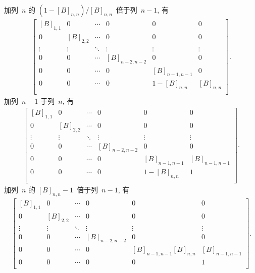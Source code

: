 加列~\(n\) 的 \((1 - [B]_{n,n})/[B]_{n,n}\)~倍于列~\(n-1\), 有
\begin{align*}
    \begin{bmatrix}
        [B]_{1,1} & 0         & \cdots & 0             & 0             & 0         \\
        0         & [B]_{2,2} & \cdots & 0             & 0             & 0         \\
        \vdots    & \vdots    & \ddots & \vdots        & \vdots        & \vdots    \\
        0         & 0         & \cdots & [B]_{n-2,n-2} & 0             & 0         \\
        0         & 0         & \cdots & 0             & [B]_{n-1,n-1} & 0         \\
        0         & 0         & \cdots & 0             & 1-[B]_{n,n}   & [B]_{n,n} \\
    \end{bmatrix}.
\end{align*}
加列~\(n-1\) 于列~\(n\), 有
\begin{align*}
    \begin{bmatrix}
        [B]_{1,1} & 0         & \cdots & 0             & 0             & 0             \\
        0         & [B]_{2,2} & \cdots & 0             & 0             & 0             \\
        \vdots    & \vdots    & \ddots & \vdots        & \vdots        & \vdots        \\
        0         & 0         & \cdots & [B]_{n-2,n-2} & 0             & 0             \\
        0         & 0         & \cdots & 0             & [B]_{n-1,n-1} & [B]_{n-1,n-1} \\
        0         & 0         & \cdots & 0             & 1-[B]_{n,n}   & 1             \\
    \end{bmatrix}.
\end{align*}
加列~\(n\) 的 \([B]_{n,n}-1\)~倍于列~\(n-1\), 有
\begin{align*}
    \begin{bmatrix}
        [B]_{1,1} & 0         & \cdots & 0             & 0                       & 0             \\
        0         & [B]_{2,2} & \cdots & 0             & 0                       & 0             \\
        \vdots    & \vdots    & \ddots & \vdots        & \vdots                  & \vdots        \\
        0         & 0         & \cdots & [B]_{n-2,n-2} & 0                       & 0             \\
        0         & 0         & \cdots & 0             & [B]_{n-1,n-1} [B]_{n,n} & [B]_{n-1,n-1} \\
        0         & 0         & \cdots & 0             & 0                       & 1             \\
    \end{bmatrix}.
\end{align*}
